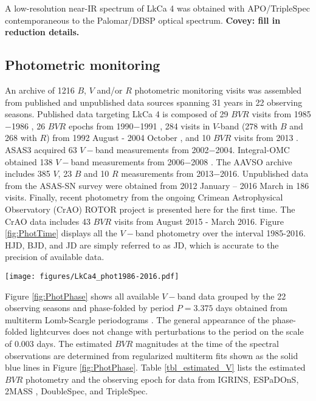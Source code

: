 \documentclass[twocolumn]{emulateapj}%
\newcommand{\name}{LkCa 4 }
\begin{document}
A low-resolution near-IR spectrum of LkCa 4 was obtained with APO/TripleSpec \citep{Wilson04} contemporaneous to the Palomar/DBSP optical spectrum.  {\bf Covey:  fill in reduction details.}


\subsection{Photometric monitoring}

An archive of 1216 $B$, $V$ and/or $R$ photometric monitoring visits was assembled from published and unpublished data sources spanning 31 years in 22 observing seasons.  Published data targeting \name is composed of 29 $BVR$ visits from 1985$-$1986 \citep{vrba93}, 26 $BVR$ epochs from 1990$-$1991 \citep{bouvier93}, 284 visits in $V$-band (278 with $B$ and 268 with $R$) from 1992 August - 2004 October \citep{grankin08}, and 10 $BVR$ visits from 2013 \citep{donati14}.  ASAS3 \citep{pojmanski04} acquired 63 $V-$band measurements from 2002$-$2004.  Integral-OMC obtained 138 $V-$band measurements from 2006$-$2008 \citep{garzon12}.  The AAVSO archive \citep{kafka16} includes 385 $V$, 23 $B$ and 10 $R$ measurements from 2013$-$2016.  Unpublished data from the ASAS-SN survey \citep{shappee14} were obtained from 2012 January -- 2016 March in 186 visits.  Finally, recent photometry from the ongoing Crimean Astrophysical Observatory (CrAO) ROTOR project \citep{grankin08} is presented here for the first time.  The CrAO data includes 43 $BVR$ visits from August 2015 - March 2016. Figure \ref{fig:PhotTime} displays all the $V-$band photometry over the interval 1985-2016.  HJD, BJD, and JD are simply referred to as JD, which is accurate to the precision of available data.


\begin{figure*}
 \centering
 \texttt{[image: figures/LkCa4\_phot1986-2016.pdf]}
 \caption{Overview of \name $V-$band photometric monitoring from 1986$-$2016.  The vertical lines denote the observing epochs of 2MASS, IGRINS, ESPaDOnS, DoubleSpec, and TripleSpec.  The near contemporaneous DoubleSpec and TripleSpec epochs lay on top of each other on this scale, as do the 12 ESPaDOnS epochs.  The abscissa range is equal to the current lifespan of the first author of this paper.}
 \label{fig:PhotTime}
\end{figure*}

Figure \ref{fig:PhotPhase} shows all available $V-$band data grouped by the 22 observing seasons and phase-folded by period $P=3.375$ days obtained from multiterm Lomb-Scargle periodograms \citep{ivezic14}.  The general appearance of the phase-folded lightcurves does not change with perturbations to the period on the scale of 0.003 days.  The estimated $BVR$ magnitudes at the time of the spectral observations are determined from regularized multiterm fits \citep{vanderplas15a} shown as the solid blue lines in Figure \ref{fig:PhotPhase}.  Table \ref{tbl_estimated_V} lists the estimated $BVR$ photometry and the observing epoch for data from IGRINS, ESPaDOnS, 2MASS \citep{skrutskie06}, DoubleSpec, and TripleSpec.  
\end{document}
